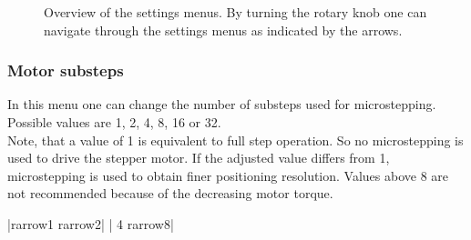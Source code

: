 \begin{figure}[H]
\caption[Overview of the settings menus.]{Overview of the settings menus. By turning
the rotary knob one can navigate through the settings menus as indicated by the arrows.}
\label{settings_menu}
\end{figure}



\subsubsection{Motor substeps}
\label{menu_substeps}
In this menu one can change the number of substeps used for microstepping. Possible values are 1, 2, 4, 8, 16 or 32.\\
Note, that a value of 1 is equivalent to full step operation. So no microstepping is used to drive the stepper motor. If the adjusted value differs from 1, microstepping is used to obtain finer positioning resolution. Values above 8 are not recommended because of the decreasing motor torque.
\begin{center}
  |{rarrow}1      {rarrow}2|
             | 4      {rarrow}8|
\end{center}

